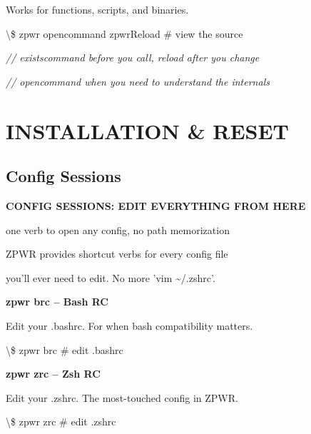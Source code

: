 \documentclass[11pt,a4paper,twoside]{book}
\begin{document}
Works for functions, scripts, and binaries.

\begin{codebox}
\textbackslash{}\$ zpwr opencommand zpwrReload  \# view the source\\
\end{codebox}

{\small\itshape\color{dimtext} // existscommand before you call, reload after you change}

{\small\itshape\color{dimtext} // opencommand when you need to understand the internals}


\vspace{16pt}


\chapter{INSTALLATION \& RESET}

\section{Config Sessions}


\vspace{10pt}
{\large\bfseries\color{neoncyan} CONFIG SESSIONS: EDIT EVERYTHING FROM HERE}\vspace{6pt}

one verb to open any config, no path memorization

ZPWR provides shortcut verbs for every config file

you'll ever need to edit. No more 'vim \textasciitilde{}/.zshrc'.


\vspace{12pt}
{\bfseries\color{neonyellow} zpwr brc  -- Bash RC}\vspace{4pt}

Edit your .bashrc. For when bash compatibility matters.

\begin{codebox}
\textbackslash{}\$ zpwr brc                    \# edit .bashrc\\
\end{codebox}


\vspace{12pt}
{\bfseries\color{neonyellow} zpwr zrc  -- Zsh RC}\vspace{4pt}

Edit your .zshrc. The most-touched config in ZPWR.

\begin{codebox}
\textbackslash{}\$ zpwr zrc                    \# edit .zshrc\\
\end{codebox}
\end{document}
